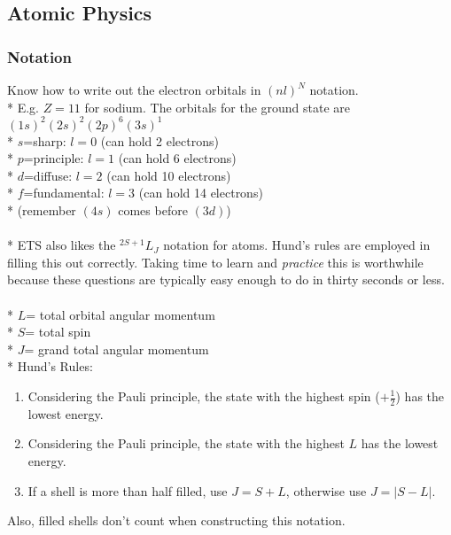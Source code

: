 \subsection{Atomic Physics}

\subsubsection{Notation}
Know how to write out the electron orbitals in \((nl)^N\) notation.\\*
E.g. \(Z=11\) for sodium. The orbitals for the ground state are \((1s)^2(2s)^2(2p)^6(3s)^1\)\\*
\(s\)=sharp: \(l=0\) (can hold 2 electrons)\\*
\(p\)=principle: \(l=1\) (can hold 6 electrons)\\*
\(d\)=diffuse: \(l=2\) (can hold 10 electrons)\\*
\(f\)=fundamental: \(l=3\) (can hold 14 electrons)\\*
(remember \((4s)\) comes before \((3d)\))\\\\*
ETS also likes the \(^{2S+1}L_J\) notation for atoms. Hund's rules are employed in filling this out correctly.
Taking time to learn and \emph{practice} this is worthwhile because these questions are typically easy enough to do in thirty seconds or less.\\\\*
\(L\)= total orbital angular momentum\\*
\(S\)= total spin\\*
\(J\)= grand total angular momentum\\*
Hund's Rules:
\begin{enumerate}
\item Considering the Pauli principle, the state with the highest spin (\(+\frac{1}{2}\)) has the lowest energy.
\item Considering the Pauli principle, the state with the highest \(L\) has the lowest energy.
\item If a shell is more than half filled, use \(J=S+L\), otherwise use \(J=|S-L|\).
\end{enumerate}
Also, filled shells don't count when constructing this notation.

